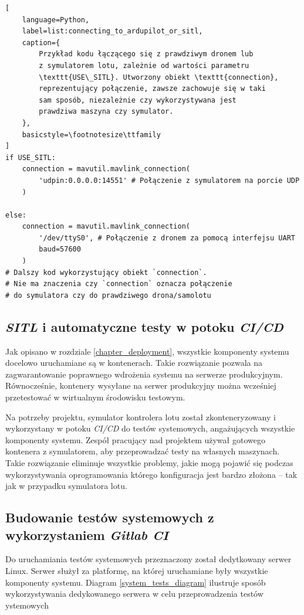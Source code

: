 \begin{lstlisting}[
    language=Python,
    label=list:connecting_to_ardupilot_or_sitl,
    caption={
        Przykład kodu łączącego się z prawdziwym dronem lub 
        z symulatorem lotu, zależnie od wartości parametru
        \texttt{USE\_SITL}. Utworzony obiekt \texttt{connection},
        reprezentujący połączenie, zawsze zachowuje się w taki
        sam sposób, niezależnie czy wykorzystywana jest
        prawdziwa maszyna czy symulator. 
    },
    basicstyle=\footnotesize\ttfamily
]
if USE_SITL:
    connection = mavutil.mavlink_connection(
        'udpin:0.0.0.0:14551' # Połączenie z symulatorem na porcie UDP
    )

else:    
    connection = mavutil.mavlink_connection(
        '/dev/ttyS0', # Połączenie z dronem za pomocą interfejsu UART
        baud=57600
    )
# Dalszy kod wykorzystujący obiekt `connection`.
# Nie ma znaczenia czy `connection` oznacza połączenie
# do symulatora czy do prawdziwego drona/samolotu
\end{lstlisting}

\subsection{\textit{SITL} i automatyczne testy w potoku \textit{CI/CD}}

Jak opisano w rozdziale \ref{chapter_deployment}, wszystkie komponenty systemu
docelowo uruchamiane są w kontenerach. Takie rozwiązanie pozwala na zagwarantowanie
poprawnego wdrożenia systemu na serwerze produkcyjnym. Równocześnie, kontenery wysyłane
na serwer produkcyjny można wcześniej przetestować w wirtualnym środowisku testowym.

Na potrzeby projektu, symulator kontrolera lotu został zkonteneryzowany i wykorzystany
w potoku \textit{CI/CD} do testów systemowych, angażujących wszystkie komponenty systemu.
Zespół pracujący nad projektem używał gotowego kontenera z symulatorem,
aby przeprowadzać testy na własnych maszynach. Takie rozwiązanie eliminuje wszystkie
problemy, jakie mogą pojawić się podczas wykorzystywania oprogramowania którego
konfiguracja jest bardzo złożona -- tak jak w przypadku symulatora lotu.

\subsection{Budowanie testów systemowych z wykorzystaniem \textit{Gitlab CI}}

Do uruchamiania testów systemowych przeznaczony został dedytkowany serwer
Linux. Serwer służył za platformę, na której uruchamiane były wszystkie 
komponenty systemu. Diagram \ref{system_tests_diagram} ilustruje 
sposób wykorzystywania dedykowanego serwera w celu przeprowadzenia 
testów ystemowych

